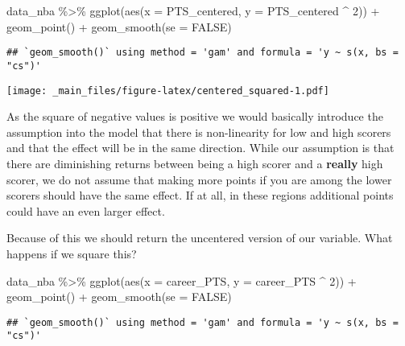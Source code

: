 \documentclass[
]{book}
\newenvironment{Shaded}{\begin{snugshade}}{\end{snugshade}}
\newcommand{\AttributeTok}[1]{\textcolor[rgb]{0.77,0.63,0.00}{#1}}
\newcommand{\AttributeTok}[1]{\textcolor[rgb]{0.13,0.29,0.53}{#1}}
\newcommand{\ConstantTok}[1]{\textcolor[rgb]{0.00,0.00,0.00}{#1}}
\newcommand{\ConstantTok}[1]{\textcolor[rgb]{0.56,0.35,0.01}{#1}}
\newcommand{\DecValTok}[1]{\textcolor[rgb]{0.00,0.00,0.81}{#1}}
\newcommand{\FunctionTok}[1]{\textcolor[rgb]{0.00,0.00,0.00}{#1}}
\newcommand{\FunctionTok}[1]{\textcolor[rgb]{0.13,0.29,0.53}{\textbf{#1}}}
\newcommand{\NormalTok}[1]{#1}
\newcommand{\SpecialCharTok}[1]{\textcolor[rgb]{0.00,0.00,0.00}{#1}}
\newcommand{\SpecialCharTok}[1]{\textcolor[rgb]{0.81,0.36,0.00}{\textbf{#1}}}
\begin{document}
\begin{Shaded}
\begin{Highlighting}[]
\NormalTok{data\_nba }\SpecialCharTok{\%\textgreater{}\%} 
  \FunctionTok{ggplot}\NormalTok{(}\FunctionTok{aes}\NormalTok{(}\AttributeTok{x =}\NormalTok{ PTS\_centered, }\AttributeTok{y =}\NormalTok{ PTS\_centered }\SpecialCharTok{\^{}} \DecValTok{2}\NormalTok{)) }\SpecialCharTok{+}
  \FunctionTok{geom\_point}\NormalTok{() }\SpecialCharTok{+}
  \FunctionTok{geom\_smooth}\NormalTok{(}\AttributeTok{se =} \ConstantTok{FALSE}\NormalTok{)}
\end{Highlighting}
\end{Shaded}

\begin{verbatim}
## `geom_smooth()` using method = 'gam' and formula = 'y ~ s(x, bs = "cs")'
\end{verbatim}

\texttt{[image: \_main\_files/figure-latex/centered\_squared-1.pdf]}

As the square of negative values is positive we would basically introduce the
assumption into the model that there is non-linearity for low and high scorers
and that the effect will be in the same direction. While our assumption is that
there are diminishing returns between being a high scorer and a \textbf{really} high
scorer, we do not assume that making more points if you are among the lower
scorers should have the same effect. If at all, in these regions additional
points could have an even larger effect.

Because of this we should return the uncentered version of our variable. What
happens if we square this?

\begin{Shaded}
\begin{Highlighting}[]
\NormalTok{data\_nba }\SpecialCharTok{\%\textgreater{}\%} 
  \FunctionTok{ggplot}\NormalTok{(}\FunctionTok{aes}\NormalTok{(}\AttributeTok{x =}\NormalTok{ career\_PTS, }\AttributeTok{y =}\NormalTok{ career\_PTS }\SpecialCharTok{\^{}} \DecValTok{2}\NormalTok{)) }\SpecialCharTok{+}
  \FunctionTok{geom\_point}\NormalTok{() }\SpecialCharTok{+}
  \FunctionTok{geom\_smooth}\NormalTok{(}\AttributeTok{se =} \ConstantTok{FALSE}\NormalTok{)}
\end{Highlighting}
\end{Shaded}

\begin{verbatim}
## `geom_smooth()` using method = 'gam' and formula = 'y ~ s(x, bs = "cs")'
\end{verbatim}
\end{document}
